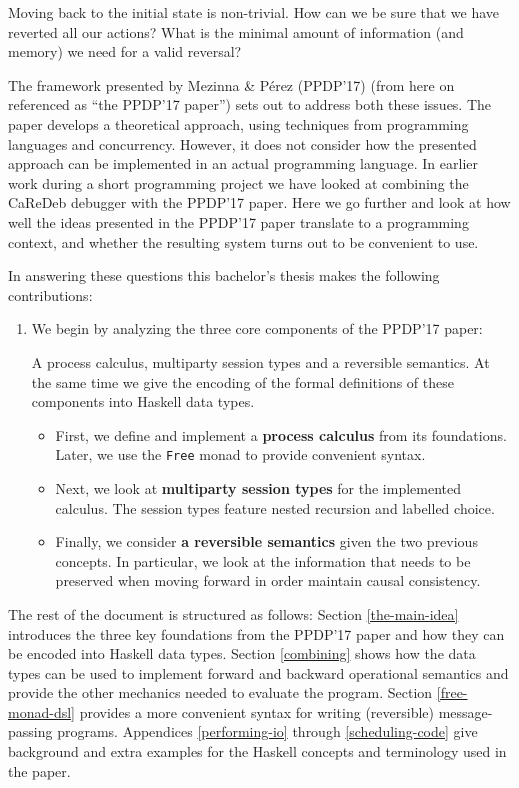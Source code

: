 \documentclass[runningheads,plain]{llncs}
\begin{document}
Moving back to the initial state is non-trivial. How can we be sure that
we have reverted all our actions? What is the minimal amount of
information (and memory) we need for a valid reversal?

The framework presented by Mezinna \& Pérez (PPDP'17) \cite{PPDP} (from
here on referenced as ``the PPDP'17 paper'') sets out to address both
these issues. The paper develops a theoretical approach, using
techniques from programming languages and concurrency. However, it does
not consider how the presented approach can be implemented in an actual
programming language. In earlier work during a short programming project
we have looked at combining the CaReDeb debugger \cite{caredeb} with the
PPDP'17 paper. Here we go further and look at how well the ideas
presented in the PPDP'17 paper translate to a programming context, and
whether the resulting system turns out to be convenient to use.

In answering these questions this bachelor's thesis makes the following
contributions:

\begin{enumerate}
\def\labelenumi{\arabic{enumi}.}
\item
  We begin by analyzing the three core components of the PPDP'17 paper:

  A process calculus, multiparty session types
  \cite{DBLP:conf/esop/HondaVK98,DBLP:conf/popl/HondaYC08} and a
  reversible semantics. At the same time we give the encoding of the
  formal definitions of these components into Haskell data types.

  \begin{itemize}
  \item
    First, we define and implement a \textbf{process calculus} from its
    foundations. Later, we use the \texttt{Free} monad to provide
    convenient syntax.
  \item
    Next, we look at \textbf{multiparty session types} for the
    implemented calculus. The session types feature nested recursion and
    labelled choice.
  \item
    Finally, we consider \textbf{a reversible semantics} given the two
    previous concepts. In particular, we look at the information that
    needs to be preserved when moving forward in order maintain causal
    consistency.
  \end{itemize}
\end{enumerate}

The rest of the document is structured as follows: Section
\ref{the-main-idea} introduces the three key foundations from the
PPDP'17 paper and how they can be encoded into Haskell data types.
Section \ref{combining} shows how the data types can be used to
implement forward and backward operational semantics and provide the
other mechanics needed to evaluate the program. Section
\ref{free-monad-dsl} provides a more convenient syntax for writing
(reversible) message-passing programs. Appendices \ref{performing-io}
through \ref{scheduling-code} give background and extra examples for the
Haskell concepts and terminology used in the paper.
\end{document}
